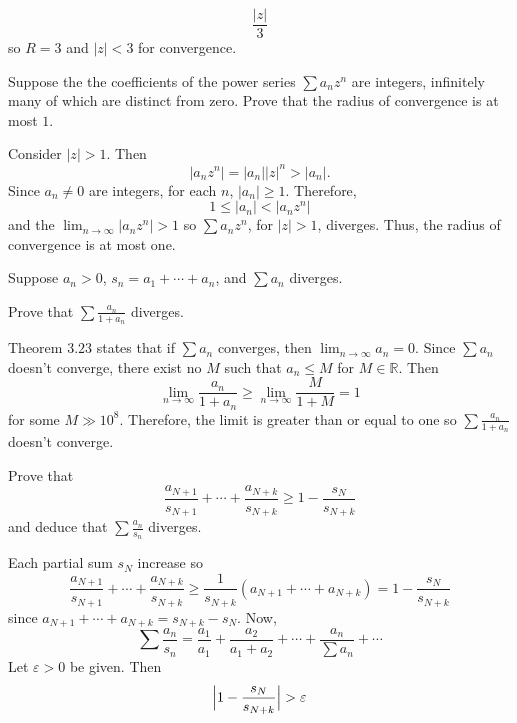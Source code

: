 \begin{exercise}
\begin{exercise}[label = (\alph*)]
\[    \frac{\lvert z\rvert}{3}
    \]
    so \(R = 3\) and \(\lvert z\rvert < 3\) for convergence.
  \end{exercise}
\item
  Suppose the the coefficients of the power series \(\sum a_nz^n\) are
  integers, infinitely many of which are distinct from zero.
  Prove that the radius of convergence is at most \(1\).
  \par\smallskip
  Consider \(\lvert z\rvert > 1\).
  Then
  \[
  \lvert a_nz^n\rvert = \lvert a_n\rvert\lvert z\rvert ^n > \lvert a_n\rvert.
  \]
  Since \(a_n\neq 0\) are integers, for each \(n\), \(\lvert a_n\rvert\geq 1\).
  Therefore,
  \[
  1\leq\lvert a_n\rvert < \lvert a_nz^n\rvert
  \]
  and the \(\lim_{n\to\infty}\lvert a_nz^n\rvert > 1\) so
  \(\sum a_nz^n\), for \(\lvert z\rvert > 1\), diverges.
  Thus, the radius of convergence is at most one.
\item
  Suppose \(a_n > 0\), \(s_n = a_1 + \cdots + a_n\), and \(\sum a_n\) diverges.
  \begin{exercise}[label = (\alph*), ref = \arabic{exercisei} (\alph*)]
  \item
    Prove that \(\sum\frac{a_n}{1 + a_n}\) diverges.
    \par\smallskip
    Theorem \(3.23\) states that if \(\sum a_n\) converges, then
    \(\lim_{n\to\infty}a_n = 0\).
    Since \(\sum a_n\) doesn't converge, there exist no \(M\) such that
    \(a_n\leq M\) for \(M\in\mathbb{R}\).
    Then
    \[
    \lim_{n\to\infty}\frac{a_n}{1 + a_n}\geq
    \lim_{n\to\infty}\frac{M}{1 + M} = 1
    \]
    for some \(M\gg 10^8\).
    Therefore, the limit is greater than or equal to one so
    \(\sum\frac{a_n}{1 + a_n}\) doesn't converge.
  \item
    \label{3.11.b}
    Prove that
    \[
    \frac{a_{N + 1}}{s_{N + 1}} + \cdots + \frac{a_{N + k}}{s_{N + k}}\geq 1
    - \frac{s_N}{s_{N + k}}
    \]
    and deduce that \(\sum\frac{a_n}{s_n}\) diverges.
    \par\smallskip
    Each partial sum \(s_N\) increase so
    \[
    \frac{a_{N + 1}}{s_{N + 1}} + \cdots + \frac{a_{N + k}}{s_{N + k}}\geq
    \frac{1}{s_{N + k}}(a_{N + 1} + \cdots + a_{N + k})  =
    1 - \frac{s_N}{s_{N + k}}
    \]
    since \(a_{N + 1} + \cdots + a_{N + k} = s_{N + k} - s_N\).
    Now,
    \[
    \sum\frac{a_n}{s_n} = \frac{a_1}{a_1} + \frac{a_2}{a_1 + a_2} + \cdots
    + \frac{a_n}{\sum a_n} + \cdots
    \]
    Let \(\varepsilon > 0\) be given.
    Then
    \[
    \Bigl\lvert 1 - \frac{s_N}{s_{N + k}}\Bigr\rvert > \varepsilon
\]
\end{exercise}
\end{exercise}
